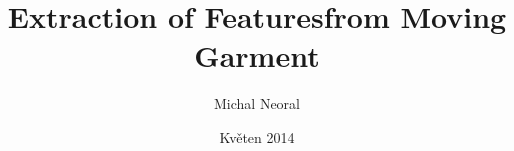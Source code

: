 



\def\thednum{(\the\chapnum.\the\dnum)}

\def\mind#1{\Red{\bf#1}\Black}
\def\dopln{\mind{DOPLŇ~ODKAZ!}}
\def\task#1{\Green{#1}\Black}
\def\lorem{\mind{Lorem ipsum dolor sit amet, consectetur adipiscing elit. Curabitur arcu dolor, congue sit amet pellentesque vitae, semper ac ligula. Nam eu elit erat. Phasellus pretium at tellus sed commodo. Quisque auctor metus eu diam pretium pulvinar. Curabitur posuere ligula sed dapibus aliquet. Sed aliquet malesuada felis, vel aliquam lacus laoreet non. Pellentesque in tristique erat. Ut mollis consequat interdum. Integer orci velit, venenatis sed ligula et, pretium dapibus sem. Nam rhoncus urna sed urna volutpat congue. Ut suscipit ipsum vel.}}
\def\newbeg{}
\def\newend{}


\worktype [B/EN]
\title      {Extraction of Features\nl from Moving Garment}
\author     {Michal Neoral}
\date       {Květen 2014}

\pagetwo    {}  %


